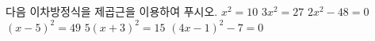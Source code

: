 다음 이차방정식을 제곱근을 이용하여 푸시오.
 $x^2=10$
 $3x^2=27$
 $2x^2-48=0$
 $(x-5)^2=49$
 $5(x+3)^2=15$
 $(4x-1)^2-7=0$
